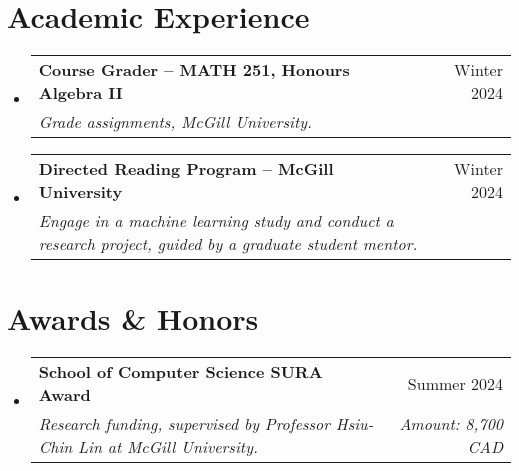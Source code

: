\documentclass[letterpaper,11pt]{article}
\makeatletter
\newcommand{\resumeSubheading}[4]{
  \vspace{-2pt}\item
    \begin{tabular*}{0.97\textwidth}[t]{l@{\extracolsep{\fill}}r}
      \textbf{#1} & #2 \\
      \textit{\small #3} & \textit{\small #4} \\
    \end{tabular*}\vspace{-10pt}
}
\newcommand{\resumeSubHeadingListStart}{\begin{itemize}[leftmargin=0.15in, label={}]}
\newcommand{\resumeSubHeadingListEnd}{\end{itemize}}
\makeatother
\begin{document}

\section{Academic Experience} 
\resumeSubHeadingListStart
    \resumeSubheading
    {Course Grader -- MATH 251, Honours Algebra II}{Winter 2024}
    {Grade assignments, McGill University.}{} 
    \resumeSubheading
    {Directed Reading Program -- McGill University}{Winter 2024}
    {Engage in a machine learning study and conduct a research project, guided by a graduate student mentor.}{}
\resumeSubHeadingListEnd


\section{Awards \& Honors} 
\resumeSubHeadingListStart
    \resumeSubheading
    {School of Computer Science SURA Award}{Summer 2024}
    {Research funding, supervised by Professor Hsiu-Chin Lin at McGill University.}{Amount: 8,700 CAD}

\resumeSubHeadingListEnd

\end{document}
